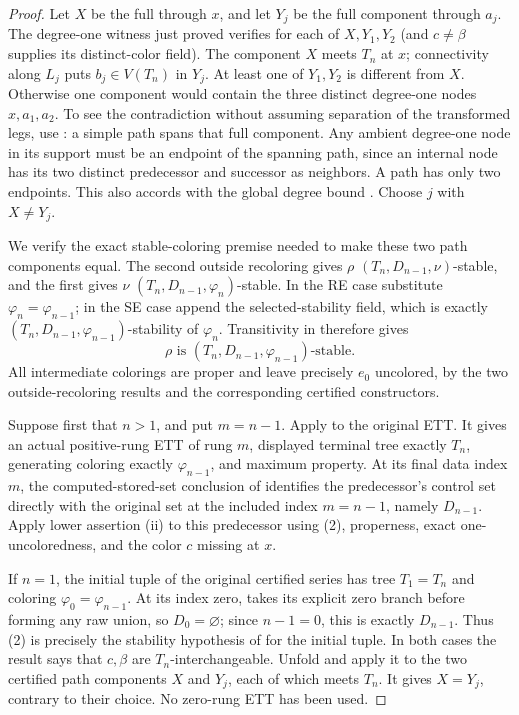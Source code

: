 \begin{proof}
Let $X$ be the full  through $x$, and let
$Y_j$ be the full component through $a_j$.  The degree-one witness just
proved verifies  for each of $X,Y_1,Y_2$
(and $c\ne\beta$ supplies its distinct-color field).  The component $X$
meets $T_n$ at $x$; connectivity along $L_j$ puts $b_j\in V(T_n)$ in
$Y_j$.  At least one of $Y_1,Y_2$ is different from $X$.  Otherwise one
component would contain the three distinct degree-one nodes
$x,a_1,a_2$.  To see the contradiction without assuming separation of
the transformed legs, use : a
simple path spans that full component.  Any ambient degree-one node in
its support must be an endpoint of the spanning path, since an internal
node has its two distinct predecessor and successor as neighbors.  A
path has only two endpoints.  This also accords with the global degree
bound .  Choose $j$ with
$X\ne Y_j$.

We verify the exact stable-coloring premise needed to make these two path
components equal.  The second outside recoloring gives
$\rho$ $(T_n,D_{n-1},\nu)$-stable, and the first gives
$\nu$ $(T_n,D_{n-1},\varphi_n)$-stable.  In the RE case substitute
$\varphi_n=\varphi_{n-1}$; in the SE case append the selected-stability
field, which is exactly
$(T_n,D_{n-1},\varphi_{n-1})$-stability of $\varphi_n$.  Transitivity in
 therefore gives
\[
        \rho\text{ is }(T_n,D_{n-1},\varphi_{n-1})\text{-stable}.
        \tag{2}
\]
All intermediate colorings are proper and leave precisely $e_0$
uncolored, by the two outside-recoloring results and the corresponding
certified constructors.

Suppose first that $n>1$, and put $m=n-1$.  Apply
 to the original ETT.  It gives an
actual positive-rung ETT of rung $m$, displayed terminal tree exactly
$T_n$, generating coloring exactly $\varphi_{n-1}$, and maximum
property.  At its final data index $m$, the computed-stored-set
conclusion of  identifies the
predecessor's control set directly with the original set at the included
index $m=n-1$, namely $D_{n-1}$.  Apply
lower assertion (ii) to this predecessor using (2), properness, exact
one-uncoloredness, and the color $c$ missing at $x$.

If $n=1$, the initial tuple of the original certified series has tree
$T_1=T_n$ and coloring $\varphi_0=\varphi_{n-1}$.  At its index zero,
 takes its explicit zero branch before
forming any raw union, so $D_0=\varnothing$; since $n-1=0$, this is
exactly $D_{n-1}$.  Thus (2) is precisely the stability hypothesis of
 for the initial tuple.  In both cases the result says that
$c,\beta$ are $T_n$-interchangeable.  Unfold
 and apply it to the two certified path
components $X$ and $Y_j$, each of which meets $T_n$.  It gives $X=Y_j$,
contrary to their choice.  No zero-rung ETT has been used.

\end{proof}
